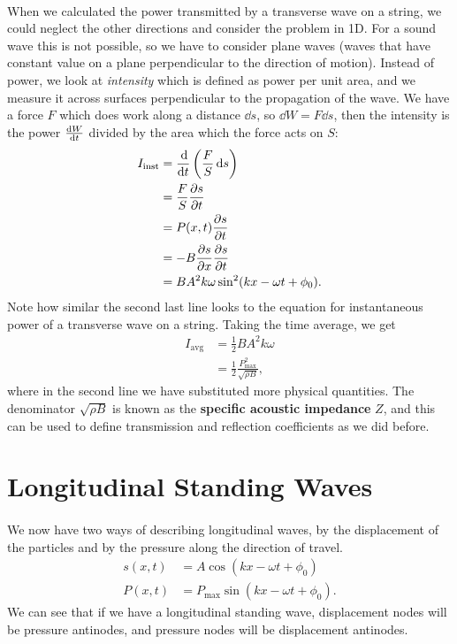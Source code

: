 \documentclass[../classical_mechanics.tex]{subfiles}
\begin{document}
        \paragraph{}
        When we calculated the power transmitted by a transverse wave on a string, we could neglect the other directions and consider the problem in 1D.
        For a sound wave this is not possible, so we have to consider plane waves (waves that have constant value on a plane perpendicular to the direction of motion).
        Instead of power, we look at \textit{intensity} which is defined as power per unit area, and we measure it across surfaces perpendicular to the propagation of the wave.
        We have a force $F$ which does work along a distance $\dd{s}$, so $\dd{W}=F\dd{s}$, then the intensity is the power $\dv{W}{t}$ divided by the area which the force acts on $S$:
        \begin{align}
            I_\text{inst}&=\dv{}{t}\left(\frac{F}{S}\dd{s}\right)\\
            &=\frac{F}{S}\pdv{s}{t}\\
            &=P(x,t)\pdv{s}{t}\\
            &=-B\pdv{s}{x}\pdv{s}{t}\\
            &=BA^2k\omega\sin^2(kx-\omega t+\phi_0).
        \end{align}
        Note how similar the second last line looks to the equation for instantaneous power of a transverse wave on a string.
        Taking the time average, we get
        \begin{align}
            I_\text{avg}&=\frac{1}{2}BA^2k\omega\\
            &=\frac{1}{2}\frac{P_\text{max}^2}{\sqrt{\rho B}},
        \end{align}
        where in the second line we have substituted more physical quantities.
        The denominator $\sqrt{\rho B}$ is known as the \textbf{specific acoustic impedance} $Z$, and this can be used to define transmission and reflection coefficients as we did before.

    \section{Longitudinal Standing Waves}
        \paragraph{}
        We now have two ways of describing longitudinal waves, by the displacement of the particles and by the pressure along the direction of travel.
        \begin{align}
            s(x,t)&=A\cos(kx-\omega t+\phi_0)\\
            P(x,t)&=P_\text{max}\sin(kx-\omega t+\phi_0).
        \end{align}
        We can see that if we have a longitudinal standing wave, displacement nodes will be pressure antinodes, and pressure nodes will be displacement antinodes.
\end{document}
